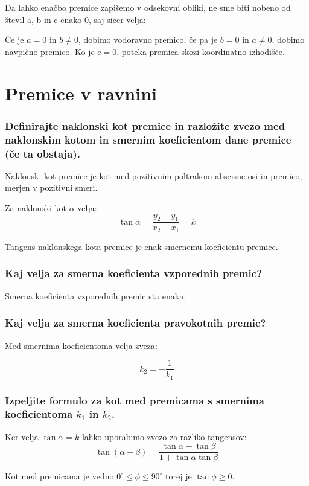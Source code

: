 \documentclass{article}
\begin{document}
Da lahko enačbo premice zapišemo v odsekovni obliki, ne sme biti nobeno od števil a, b in c enako 0, saj sicer velja:

Če je $a=0$ in $b \neq 0$, dobimo vodoravno premico, če pa je $b=0$ in $a \neq 0$, dobimo navpično premico. Ko je $\mathrm{c}=0$, poteka premica skozi koordinatno izhodišče.

\section{Premice v ravnini}
\subsubsection*{Definirajte naklonski kot premice in razložite zvezo med naklonskim kotom in smernim koeficientom dane premice (če ta obstaja).}

Naklonski kot premice je kot med pozitivnim poltrakom abscisne osi in premico, merjen v pozitivni smeri. 

Za naklonski kot $\alpha$ velja:
$$
\tan \alpha = \frac{y_2 - y_1}{x_2 - x_1} = k
$$

Tangens naklonskega kota premice je enak smernemu koeficientu premice.

\subsubsection*{Kaj velja za smerna koeficienta vzporednih premic?}

Smerna koeficienta vzporednih premic sta enaka.

\subsubsection*{Kaj velja za smerna koeficienta pravokotnih premic?}
Med smernima koeficientoma velja zveza:

$$
k_2 = -\frac{1}{k_1}
$$


\subsubsection*{Izpeljite formulo za kot med premicama s smernima koeficientoma $k_{1}$ in $k_{2}$.}

Ker velja $\tan \alpha = k$ lahko uporabimo zvezo za razliko tangensov:
    $$
        \tan(\alpha - \beta) = \frac{\tan \alpha - \tan \beta}{1 + \tan \alpha \tan \beta} 
    $$

Kot med premicama je vedno $0^\circ \leq \phi \leq 90^\circ$ torej je $\tan \phi \geq 0$.
\end{document}
